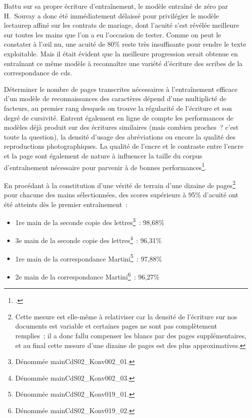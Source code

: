 \documentclass[a4paper,12pt,twoside]{book}
\begin{document}
				Battu sur sa propre écriture d'entraînement, le modèle entraîné de zéro par H.~Souvay a donc été immédiatement délaissé pour privilégier le modèle \gls{lectaurep} affiné sur les contrats de mariage, dont l'acuité s'est révélée meilleure sur toutes les mains que l'on a eu l'occasion de tester. Comme on peut le constater à l'œil nu, une acuité de 80\% reste très insuffisante pour rendre le texte exploitable. Mais il était évident que la meilleure progression serait obtenue en entraînant ce même modèle à reconnaître une variété d'écriture des scribes de la correspondance de \gls{cds}.
				
				Déterminer le nombre de pages transcrites nécessaires à l'entraînement efficace d'un modèle de reconnaissances des caractères dépend d'une multiplicté de facteurs, au premier rang desquels on trouve la régularité de l'écriture et son degré de cursivité. Entrent également en ligne de compte les performances de modèles déjà produit sur des écritures similaires (mais combien proches~? c'est toute la question), la densité d'usage des abréviations ou encore la qualité des reproductions photographiques. La qualité de l'encre et le contraste entre l'encre et la page sont également de nature à influencer la taille du corpus d'entraînement nécessaire pour parvenir à de bonnes performances\footcite{stokesEScriptoriumVREManuscript2021}.
				
				En procédant à la constitution d'une vérité de terrain d'une dizaine de pages\footnote{Cette mesure est elle-même à relativiser car la densité de l'écriture sur nos documents est variable et certaines pages ne sont pas complètement remplies~; il a donc fallu compenser les blancs par des pages supplémentaires, et au final cette mesure d'une dizaine de pages est des plus approximatives.} pour chacune des mains sélectionnées, des scores supérieurs à 95\% d'acuité ont été atteints dès le premier entraînement~:
				
				\begin{itemize}
					\item 1re main de la seconde copie des lettres\footnote{Dénommée \textsf{mainCdS02\_Konv002\_01}.}~: 98,68\%
					\item 3e main de la seconde copie des lettres\footnote{Dénommée \textsf{mainCdS02\_Konv002\_03}.}~: 96,31\%
					\item 1re main de la correspondance Martini\footnote{Dénommée \textsf{mainCdS02\_Konv019\_01}.}~: 97,88\%
					\item 2e main de la correspondance Martini\footnote{Dénommée \textsf{mainCdS02\_Konv019\_02}.}~: 96,27\%
				\end{itemize}
			
\end{document}
